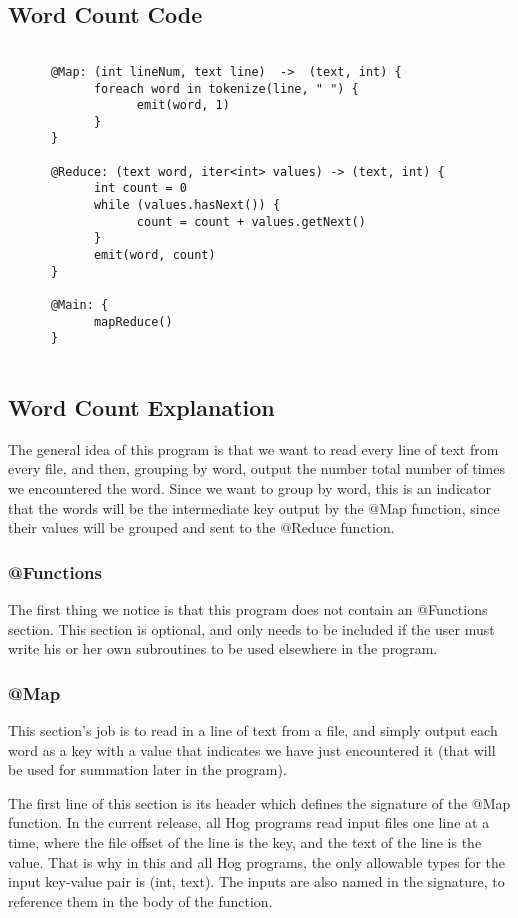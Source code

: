 \documentclass{article}
\begin{document}
\subsection*{Word Count Code}
\begin{verbatim}
      
      @Map: (int lineNum, text line)  ->  (text, int) {
            foreach word in tokenize(line, " ") {
                  emit(word, 1)
            }
      }
      
      @Reduce: (text word, iter<int> values) -> (text, int) {
            int count = 0
            while (values.hasNext()) {
                  count = count + values.getNext()
            }
            emit(word, count)
      }
      
      @Main: {
            mapReduce()
      }
      
\end{verbatim}

\subsection*{Word Count Explanation}
The general idea of this program is that we want to read every line of text from every file, and then, grouping by word, output the number total number of times we encountered the word. Since we want to group by word, this is an indicator that the words will be the intermediate key output by the @Map function, since their values will be grouped and sent to the @Reduce function.
\subsubsection*{@Functions}
The first thing we notice is that this program does not contain an @Functions section. This section is optional, and only needs to be included if the user must write his or her own subroutines to be used elsewhere in the program.

\subsubsection*{@Map}
This section's job is to read in a line of text from a file, and simply output each word as a key with a value that indicates we have just encountered it (that will be used for summation later in the program).

The first line of this section is its header which defines the signature of the @Map function. In the current release, all Hog programs read input files one line at a time, where the file offset of the line is the key, and the text of the line is the value. That is why in this and all Hog programs, the only allowable types for the input key-value pair is (int, text). The inputs are also named in the signature, to reference them in the body of the function.
\end{document}
